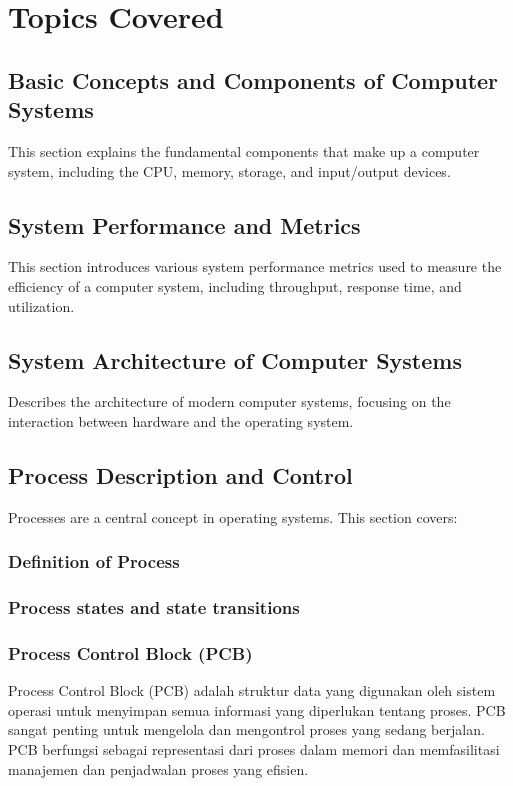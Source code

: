 \documentclass[12pt]{article}
\begin{document}
\section{Topics Covered}

\subsection{Basic Concepts and Components of Computer Systems}
This section explains the fundamental components that make up a computer system, including the CPU, memory, storage, and input/output devices.

\subsection{System Performance and Metrics}
This section introduces various system performance metrics used to measure the efficiency of a computer system, including throughput, response time, and utilization.

\subsection{System Architecture of Computer Systems}
Describes the architecture of modern computer systems, focusing on the interaction between hardware and the operating system.

\subsection{Process Description and Control}
Processes are a central concept in operating systems. This section covers:
\subsubsection{Definition of Process}
\subsubsection{Process states and state transitions}

\subsubsection{Process Control Block (PCB)}
Process Control Block (PCB) adalah struktur data yang digunakan oleh sistem operasi untuk menyimpan semua informasi yang diperlukan tentang proses. PCB sangat penting untuk mengelola dan mengontrol proses yang sedang berjalan. PCB berfungsi sebagai representasi dari proses dalam memori dan memfasilitasi manajemen dan penjadwalan proses yang efisien.
\end{document}
